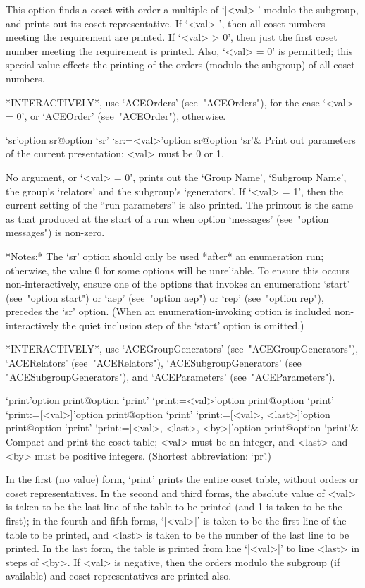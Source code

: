 This option finds a coset with order a multiple  of  `|<val>|'  modulo
the subgroup, and prints out its coset representative.  If  `<val>  ', then all coset numbers meeting the  requirement  are  printed.  If
`<val> > 0', then just the first coset number meeting the  requirement
is printed. Also, `<val> = 0' is permitted; this special value effects
the printing of the orders (modulo the subgroup) of all coset numbers.

*INTERACTIVELY*,  use  `ACEOrders'  (see~"ACEOrders"),  for  the  case
`<val> = 0', or `ACEOrder' (see~"ACEOrder"), otherwise.

\>`sr'{option sr}@{option `sr'}
\>`sr:=<val>'{option sr}@{option `sr'}&
Print out parameters of the current presentation; <val> must be  0  or
1.

No argument, or `<val> = 0', prints out the  `Group  Name',  `Subgroup
Name', the group's `relators'  and  the  subgroup's  `generators'.  If
`<val> = 1', then the current setting of  the  ``run  parameters''  is
also printed. The printout is the same as that produced at  the  start
of a run when option `messages' (see~"option messages") is non-zero.

*Notes:*
The `sr' option should  only  be  used  *after*  an  enumeration  run;
otherwise, the value 0 for some options will be unreliable. To  ensure
this occurs non-interactively, ensure one of the options that  invokes
an enumeration: `start' (see~"option  start")  or  `aep'  (see~"option
aep") or `rep' (see~"option rep"), precedes the `sr' option. (When  an
enumeration-invoking option is included  non-interactively  the  quiet
inclusion step of the `start' option is omitted.)

*INTERACTIVELY*, use `ACEGroupGenerators'  (see~"ACEGroupGenerators"),
`ACERelators'   (see~"ACERelators"),   `ACESubgroupGenerators'    (see
"ACESubgroupGenerators"), and `ACEParameters' (see~"ACEParameters").

\>`print'{option print}@{option `print'}
\>`print:=<val>'{option print}@{option `print'}
\>`print:=[<val>]'{option print}@{option `print'}
\>`print:=[<val>, <last>]'{option print}@{option `print'}
\>`print:=[<val>, <last>, <by>]'{option print}@{option `print'}&
Compact and print the coset table;  <val>  must  be  an  integer,  and
<last> and <by> must be positive integers.
(Shortest abbreviation: `pr'.)

In the first (no value) form, `print' prints the entire  coset  table,
without orders or coset  representatives.  In  the  second  and  third
forms, the absolute value of <val> is taken to be the last line of the
table to be printed (and 1 is taken to be the first);  in  the  fourth
and fifth forms, `|<val>|' is taken to be the first line of the  table
to be printed, and <last> is taken to be the number of the  last  line
to be printed. In the last  form,  the  table  is  printed  from  line
`|<val>|' to line <last> in steps of <by>. If <val> is negative,  then
the  orders   modulo   the   subgroup   (if   available)   and   coset
representatives are printed also.

